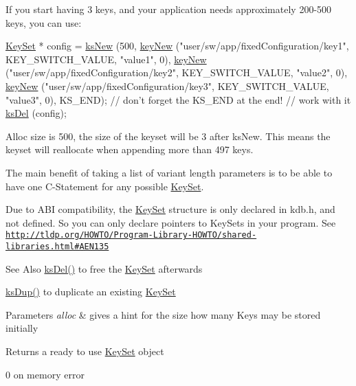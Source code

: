 If you start having 3 keys, and your application needs approximately 200-\/500 keys, you can use\-: 
\begin{DoxyCode}
\hyperlink{classkdb_1_1KeySet_a4eac9850fa4f06c07a5306befc3e4377}{KeySet} * config = \hyperlink{group__keyset_ga671e1aaee3ae9dc13b4834a4ddbd2c3c}{ksNew} (500,
        \hyperlink{group__key_gad23c65b44bf48d773759e1f9a4d43b89}{keyNew} (\textcolor{stringliteral}{"user/sw/app/fixedConfiguration/key1"}, KEY\_SWITCH\_VALUE, \textcolor{stringliteral}{
      "value1"}, 0),
        \hyperlink{group__key_gad23c65b44bf48d773759e1f9a4d43b89}{keyNew} (\textcolor{stringliteral}{"user/sw/app/fixedConfiguration/key2"}, KEY\_SWITCH\_VALUE, \textcolor{stringliteral}{
      "value2"}, 0),
        \hyperlink{group__key_gad23c65b44bf48d773759e1f9a4d43b89}{keyNew} (\textcolor{stringliteral}{"user/sw/app/fixedConfiguration/key3"}, KEY\_SWITCH\_VALUE, \textcolor{stringliteral}{
      "value3"}, 0),
        KS\_END); \textcolor{comment}{// don't forget the KS\_END at the end!}
\textcolor{comment}{// work with it}
\hyperlink{group__keyset_ga27e5c16473b02a422238c8d970db7ac8}{ksDel} (config);
\end{DoxyCode}
 Alloc size is 500, the size of the keyset will be 3 after ks\-New. This means the keyset will reallocate when appending more than 497 keys.

The main benefit of taking a list of variant length parameters is to be able to have one C-\/\-Statement for any possible \hyperlink{classkdb_1_1KeySet}{Key\-Set}.

Due to A\-B\-I compatibility, the {\ttfamily \hyperlink{classkdb_1_1KeySet}{Key\-Set}} structure is only declared in kdb.\-h, and not defined. So you can only declare {\ttfamily pointers} to {\ttfamily Key\-Sets} in your program. See \href{http://tldp.org/HOWTO/Program-Library-HOWTO/shared-libraries.html#AEN135}{\tt http\-://tldp.\-org/\-H\-O\-W\-T\-O/\-Program-\/\-Library-\/\-H\-O\-W\-T\-O/shared-\/libraries.\-html\#\-A\-E\-N135}

\begin{DoxySeeAlso}{See Also}
\hyperlink{group__keyset_ga27e5c16473b02a422238c8d970db7ac8}{ks\-Del()} to free the \hyperlink{group__keyset}{Key\-Set} afterwards 

\hyperlink{group__keyset_gac59e4b328245463f1451f68d5106151c}{ks\-Dup()} to duplicate an existing \hyperlink{group__keyset}{Key\-Set} 
\end{DoxySeeAlso}

\begin{DoxyParams}{Parameters}
{\em alloc} & gives a hint for the size how many Keys may be stored initially \\
\hline
\end{DoxyParams}
\begin{DoxyReturn}{Returns}
a ready to use \hyperlink{classkdb_1_1KeySet}{Key\-Set} object 

0 on memory error 
\end{DoxyReturn}


